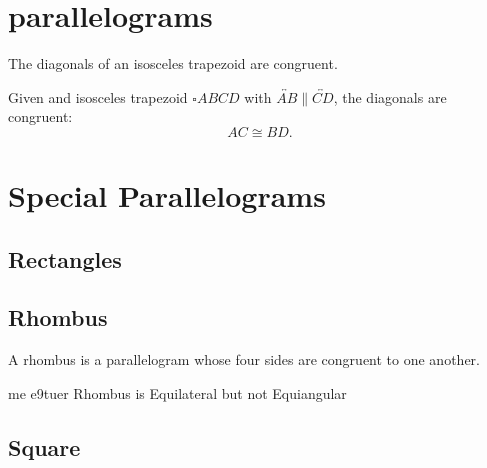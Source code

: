 \documentclass[../../../main/main.tex]{subfiles}
\begin{document}
\section{parallelograms}

\begin{theorem}
    The diagonals of an isosceles trapezoid are congruent.
\end{theorem}

\begin{theorem}
    Given and isosceles trapezoid $\square ABCD$ with $\overleftrightarrow{AB} \parallel \overleftrightarrow{CD}$, the diagonals are congruent:
    \[
    AC \cong BD.
    \]
\end{theorem}

\section{Special Parallelograms}

\subsection{Rectangles}

\subsection{Rhombus}

\begin{definition}
    A rhombus is a parallelogram whose four sides are congruent to one another.
\end{definition}

\begin{definition} me e9tuer
    Rhombus is Equilateral but not Equiangular
\end{definition}

\subsection{Square}
\end{document}
